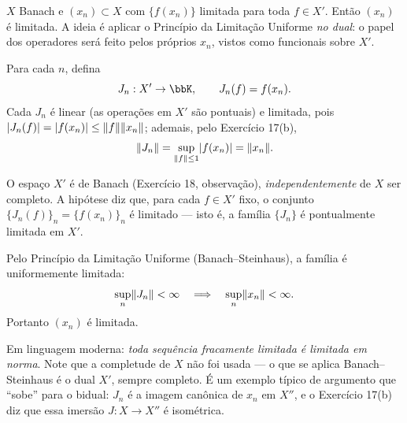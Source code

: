 \begin{exercicio}{$X$ Banach e $(x_n)\subset X$ com $\{f(x_n)\}$ limitada para toda $f\in X'$. Então $(x_n)$ é limitada.}
\sol
A ideia é aplicar o Princípio da Limitação Uniforme \emph{no dual}: o papel dos operadores será feito pelos próprios $x_n$, vistos como funcionais sobre $X'$.

Para cada $n$, defina
\[ J_n:X'\to\K,\qquad J_n(f)=f(x_n). \]
Cada $J_n$ é linear (as operações em $X'$ são pontuais) e limitada, pois $\lvert J_n(f)\rvert=\lvert f(x_n)\rvert\le\lVert f\rVert\lVert x_n\rVert$; ademais, pelo Exercício 17(b),
\[ \lVert J_n\rVert=\sup_{\lVert f\rVert\le1}\lvert f(x_n)\rvert=\lVert x_n\rVert. \]

O espaço $X'$ é de Banach (Exercício 18, observação), \emph{independentemente} de $X$ ser completo. A hipótese diz que, para cada $f\in X'$ fixo, o conjunto $\{J_n(f)\}_n=\{f(x_n)\}_n$ é limitado --- isto é, a família $\{J_n\}$ é pontualmente limitada em $X'$.

Pelo Princípio da Limitação Uniforme (Banach--Steinhaus), a família é uniformemente limitada:
\[ \sup_n\lVert J_n\rVert<\infty \quad\Longrightarrow\quad \sup_n\lVert x_n\rVert<\infty . \]
Portanto $(x_n)$ é limitada.

\begin{obs}
Em linguagem moderna: \emph{toda sequência fracamente limitada é limitada em norma}. Note que a completude de $X$ não foi usada --- o que se aplica Banach--Steinhaus é o dual $X'$, sempre completo. É um exemplo típico de argumento que ``sobe'' para o bidual: $J_n$ é a imagem canônica de $x_n$ em $X''$, e o Exercício 17(b) diz que essa imersão $J:X\to X''$ é isométrica.
\end{obs}
\end{exercicio}

